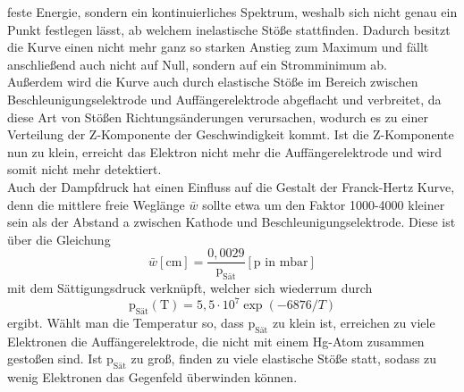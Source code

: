 feste Energie, sondern ein kontinuierliches Spektrum, weshalb sich nicht genau ein Punkt festlegen
lässt, ab welchem inelastische Stöße stattfinden. Dadurch besitzt die Kurve einen nicht mehr
ganz so starken Anstieg zum Maximum und fällt anschließend auch nicht auf Null, sondern
auf ein Stromminimum ab. \\
Außerdem wird die Kurve auch durch elastische Stöße im Bereich zwischen
Beschleunigungselektrode und Auffängerelektrode abgeflacht und verbreitet, da diese
Art von Stößen Richtungsänderungen verursachen, wodurch es zu einer Verteilung der
Z-Komponente der Geschwindigkeit kommt. Ist die Z-Komponente nun zu klein, erreicht
das Elektron nicht mehr die Auffängerelektrode und wird somit nicht mehr detektiert.\\
Auch der Dampfdruck hat einen Einfluss auf die Gestalt der Franck-Hertz Kurve, denn die
mittlere freie Weglänge $\bar{w}$ sollte etwa um den Faktor 1000-4000 kleiner
sein als der Abstand a zwischen Kathode und Beschleunigungselektrode. Diese ist
über die Gleichung
\begin{equation}
  \bar{w} [\si{\centi\meter}]= \frac{0,0029}{\text{p}_{\text{Sät}}} [\text{p}\text{ in } \si{\milli\bar}]
  \label{eqn:wegl}
\end{equation}
mit dem Sättigungsdruck verknüpft, welcher sich wiederrum durch
\begin{equation}
  \text{p}_{\text{Sät}}(\text{T}) = 5,5 \cdot 10^{7} \exp{(-6876/T)}
  \label{eqn:psat}
\end{equation}
ergibt.
Wählt man die Temperatur so, dass $\text{p}_{\text{Sät}}$ zu klein ist, erreichen
zu viele Elektronen die Auffängerelektrode, die nicht mit einem
Hg-Atom zusammen gestoßen sind. Ist $\text{p}_{\text{Sät}}$ zu groß, finden zu viele
elastische Stöße statt, sodass zu wenig Elektronen das Gegenfeld überwinden können.
